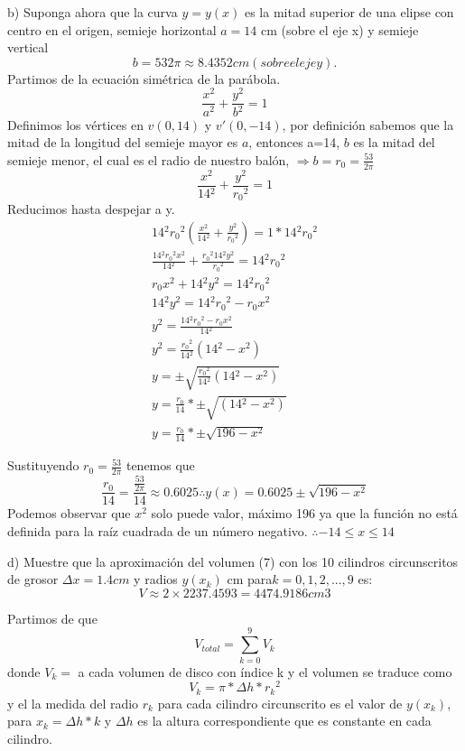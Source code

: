\documentclass{article}
\begin{document}
    b) Suponga ahora que la curva $y = y (x)$ es la mitad superior de una elipse con
    centro en el origen, semieje horizontal $a = 14$ cm (sobre el eje x) y semieje vertical
    $$b = 53 2\pi \approx 8.4352 cm (sobre el eje y).$$
    Partimos de la ecuación simétrica de la parábola.
    $$\frac{x{^2}}{a{^2}}+\frac{y{^2}}{b{^2}}=1$$Definimos los vértices en $v(0,14)$ y $v'(0,-14)$, por definición sabemos que la mitad de la longitud del semieje mayor es $a$, entonces a=14, $b$ es la mitad del semieje menor, el cual es el radio de nuestro balón, $\Rightarrow b=r_{0}=\frac{53}{2\pi}$
    $$\frac{x{^2}}{14{^2}}+\frac{y{^2}}{r_{0}{^2}}=1$$
    Reducimos hasta despejar a y.
    \begin{gather*}
    14{^2}r_{0}{^2}\left( \frac{x{^2}}{14{^2}} +\frac{y{^2}}{r_{0}{^2}}\right)= 1*14{^2}r_{0}{^2}\\
    \frac{14{^2}r_{0}{^2}x{^2}}{14{^2}} +\frac{r_{0}{^2}14{^2}y{^2}}{r_{0}{^2}}=14{^2}r_{0}{^2}\\
    r_{0}x{^2}+14{^2}y{^2}=14{^2}r_{0}{^2}\\
    14{^2}y{^2}=14{^2}r_{0}{^2}-r_{0}x{^2}\\
    y{^2}=\frac{14{^2}r_{0}{^2}-r_{0}x{^2}}{14{^2}}\\
    y{^2}=\frac{r_{0}{^2}}{14{^2}}(14{^2}-x{^2})\\
    y=\pm\sqrt{ \frac{r_{0}{^2}}{14{^2}}(14{^2}-x{^2}) }\\
    y=\frac{r_{0}}{14}*\pm\sqrt{(14{^2}-x{^2})}\\
    y=\frac{r_{0}}{14}*\pm\sqrt{196-x{^2}}
    \end{gather*}
    
    Sustituyendo $r_0=\frac{53}{2\pi}$ tenemos que $$\frac{r_{0}}{14}=\frac{\frac{53}{2\pi}}{14}\approx 0.6025\therefore y(x)=0.6025\pm \sqrt{ 196-x{^2} }$$
    Podemos observar que $x{^2}$ solo puede valor, máximo 196 ya que la función no está definida para la raíz cuadrada de un número negativo. $\therefore -14\leq x\leq 14$ 
    
    d) Muestre que la aproximación del volumen (7) con los 10 cilindros circunscritos de
    grosor $\Delta x = 1.4 cm$ y radios $y (x_{k})$ cm para$k = 0, 1, 2, . . . , 9$ es:
    $$V \approx 2 \times 2237.4593 = 4474.9186 cm3$$
    
    Partimos de que 
    $$V_{total}=\sum_{k=0}^{9}V_{k}$$
    donde $V_{k}=$ a cada volumen de disco con índice k y el volumen se traduce como$$V_{k}=\pi*\Delta h*r_{k}{^2}$$
    y el la medida del radio $r_{k}$ para cada cilindro circunscrito es el valor de $y(x_k)$, para $x_{k}=\Delta h*k$
    y $\Delta h$ es la altura correspondiente que es constante en cada cilindro.
    
\end{document}
